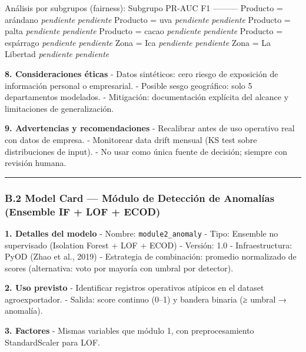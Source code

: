 Análisis por subgrupos (fairness): \textbar{} Subgrupo \textbar{} PR-AUC
\textbar{} F1 \textbar{} \textbar---\textbar---\textbar---\textbar{}
\textbar{} Producto = arándano \textbar{} \emph{pendiente} \textbar{}
\emph{pendiente} \textbar{} \textbar{} Producto = uva \textbar{}
\emph{pendiente} \textbar{} \emph{pendiente} \textbar{} \textbar{}
Producto = palta \textbar{} \emph{pendiente} \textbar{} \emph{pendiente}
\textbar{} \textbar{} Producto = cacao \textbar{} \emph{pendiente}
\textbar{} \emph{pendiente} \textbar{} \textbar{} Producto = espárrago
\textbar{} \emph{pendiente} \textbar{} \emph{pendiente} \textbar{}
\textbar{} Zona = Ica \textbar{} \emph{pendiente} \textbar{}
\emph{pendiente} \textbar{} \textbar{} Zona = La Libertad \textbar{}
\emph{pendiente} \textbar{} \emph{pendiente} \textbar{}

\textbf{8. Consideraciones éticas} - Datos sintéticos: cero riesgo de
exposición de información personal o empresarial. - Posible sesgo
geográfico: solo 5 departamentos modelados. - Mitigación: documentación
explícita del alcance y limitaciones de generalización.

\textbf{9. Advertencias y recomendaciones} - Recalibrar antes de uso
operativo real con datos de empresa. - Monitorear data drift mensual (KS
test sobre distribuciones de input). - No usar como única fuente de
decisión; siempre con revisión humana.

\begin{center}\rule{0.5\linewidth}{0.5pt}\end{center}

\subsubsection{B.2 Model Card --- Módulo de Detección de Anomalías
(Ensemble IF + LOF +
ECOD)}\label{b.2-model-card-muxf3dulo-de-detecciuxf3n-de-anomaluxedas-ensemble-if-lof-ecod}

\textbf{1. Detalles del modelo} - Nombre: \texttt{module2\_anomaly} -
Tipo: Ensemble no supervisado (Isolation Forest + LOF + ECOD) - Versión:
1.0 - Infraestructura: PyOD (Zhao et al., 2019) - Estrategia de
combinación: promedio normalizado de scores (alternativa: voto por
mayoría con umbral por detector).

\textbf{2. Uso previsto} - Identificar registros operativos atípicos en
el dataset agroexportador. - Salida: score continuo (0--1) y bandera
binaria (≥ umbral → anomalía).

\textbf{3. Factores} - Mismas variables que módulo 1, con
preprocesamiento StandardScaler para LOF.

